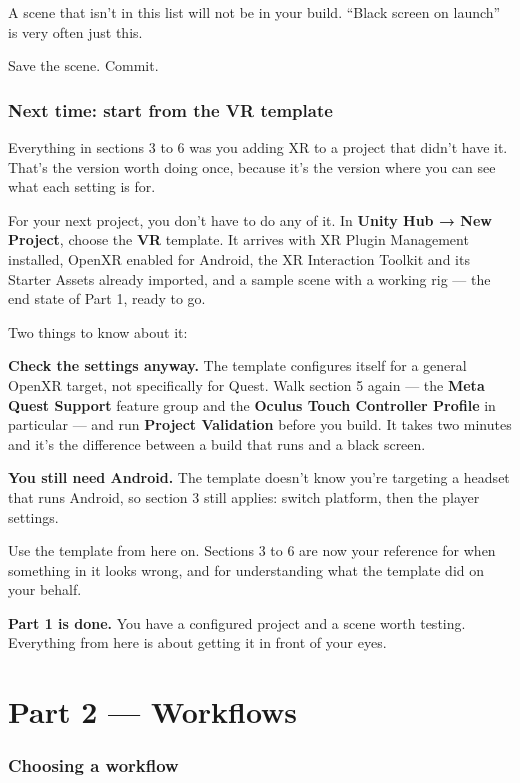 \documentclass[11pt,a4paper]{article}
\begin{document}
A scene that isn't in this list will not be in your build. ``Black screen on launch'' is
very often just this.

Save the scene. Commit.


\section{Next time: start from the VR template}\label{next-time-start-from-the-vr-template}

Everything in sections 3 to 6 was you adding XR to a project that didn't have it. That's
the version worth doing once, because it's the version where you can see what each setting
is for.

For your next project, you don't have to do any of it. In \textbf{Unity Hub → New Project},
choose the \textbf{VR} template. It arrives with XR Plugin Management installed, OpenXR enabled
for Android, the XR Interaction Toolkit and its Starter Assets already imported, and a
sample scene with a working rig --- the end state of Part 1, ready to go.

Two things to know about it:

\textbf{Check the settings anyway.} The template configures itself for a general OpenXR target,
not specifically for Quest. Walk section 5 again --- the \textbf{Meta Quest Support} feature
group and the \textbf{Oculus Touch Controller Profile} in particular --- and run \textbf{Project
Validation} before you build. It takes two minutes and it's the difference between a
build that runs and a black screen.

\textbf{You still need Android.} The template doesn't know you're targeting a headset that runs
Android, so section 3 still applies: switch platform, then the player settings.

Use the template from here on. Sections 3 to 6 are now your reference for when something
in it looks wrong, and for understanding what the template did on your behalf.

\textbf{Part 1 is done.} You have a configured project and a scene worth testing. Everything
from here is about getting it in front of your eyes.


\clearpage
\part*{Part 2 --- Workflows}

\section{Choosing a workflow}\label{choosing-a-workflow}
\end{document}
